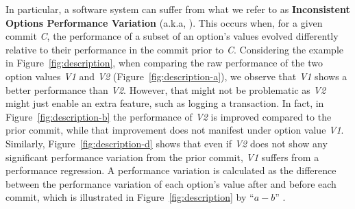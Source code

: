 In particular, a software system can suffer from what we refer to as \textbf{Inconsistent Options Performance Variation} (a.k.a, \inconsistent). This occurs when, for a given commit \emph{C}, the performance of a subset of an option's values evolved differently relative to their performance in the commit prior to \emph{C}. Considering the example in Figure~\ref{fig:description}, when comparing the raw performance of the two option values \emph{V1} and \emph{V2} (Figure~\ref{fig:description-a}), we observe that \emph{V1} shows a better performance than \emph{V2}. However, that might not be problematic as \emph{V2} might just enable an extra feature, such as logging a transaction. In fact, in Figure~\ref{fig:description-b} the performance of \emph{V2} is improved compared to the prior commit, while that improvement does not manifest under option value \emph{V1}.  %
Similarly, Figure~\ref{fig:description-d} shows that even if \emph{V2} does not show any significant performance variation from the prior commit, \emph{V1} suffers from a performance regression. 
A performance variation is calculated as the difference between the performance variation of each option's value after and before each commit, which is illustrated in Figure~\ref{fig:description} by ``$a - b$'' .


